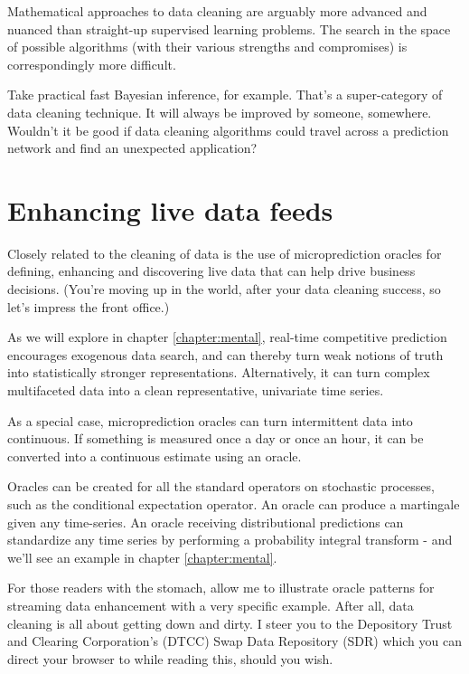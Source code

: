 Mathematical approaches to data cleaning are arguably more advanced and nuanced than straight-up supervised learning problems. The search in the space of possible algorithms (with their various strengths and compromises) is correspondingly more difficult.

Take practical fast Bayesian inference, for example. That's a super-category of data cleaning technique. It will always be improved by someone, somewhere. Wouldn't it be good if data cleaning algorithms could travel across a prediction network and find an unexpected application? 


\section{Enhancing live data feeds}
\label{sec:live}

Closely related to the cleaning of data is the use of microprediction oracles for defining, enhancing and discovering live data that can help drive business decisions. (You're moving up in the world, after your data cleaning success, so let's impress the front office.) 


As we will explore in chapter \ref{chapter:mental}, real-time competitive prediction encourages exogenous data search, and can thereby turn weak notions of truth into statistically stronger representations. Alternatively, it can turn complex multifaceted data into a clean representative, univariate time series. 


As a special case, microprediction oracles can turn intermittent data into continuous. If something is measured once a day or once an hour, it can be converted into a continuous estimate using an oracle.


Oracles can be created for all the standard operators on stochastic processes, such as the conditional expectation operator. An oracle can produce a martingale given any time-series. An oracle receiving distributional predictions can standardize any time series by performing a probability integral transform - and we'll see an example in chapter \ref{chapter:mental}.

For those readers with the stomach, allow me to illustrate oracle patterns for streaming data enhancement with a very specific example. After all, data cleaning is all about getting down and dirty. I steer you to the Depository Trust and Clearing Corporation's (DTCC) Swap Data Repository (SDR) which you can direct your browser to while reading this, should you wish.

